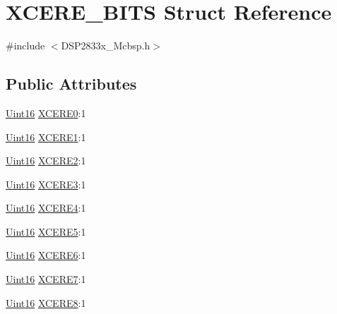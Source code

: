 \hypertarget{struct_x_c_e_r_e___b_i_t_s}{}\section{X\+C\+E\+R\+E\+\_\+\+B\+I\+T\+S Struct Reference}
\label{struct_x_c_e_r_e___b_i_t_s}


{\ttfamily \#include $<$D\+S\+P2833x\+\_\+\+Mcbsp.\+h$>$}

\subsection*{Public Attributes}
\begin{DoxyCompactItemize}
\item 
\hyperlink{_d_s_p2833x___device_8h_a59a9f6be4562c327cbfb4f7e8e18f08b}{Uint16} \hyperlink{struct_x_c_e_r_e___b_i_t_s_a74cb9805107351ca5c203ac9a94c2c35}{X\+C\+E\+R\+E0}\+:1
\item 
\hyperlink{_d_s_p2833x___device_8h_a59a9f6be4562c327cbfb4f7e8e18f08b}{Uint16} \hyperlink{struct_x_c_e_r_e___b_i_t_s_a1dd27273efef14e741394601d63bb3fe}{X\+C\+E\+R\+E1}\+:1
\item 
\hyperlink{_d_s_p2833x___device_8h_a59a9f6be4562c327cbfb4f7e8e18f08b}{Uint16} \hyperlink{struct_x_c_e_r_e___b_i_t_s_ac2d2ce4f6b28a6a240e7f7fb95eeb559}{X\+C\+E\+R\+E2}\+:1
\item 
\hyperlink{_d_s_p2833x___device_8h_a59a9f6be4562c327cbfb4f7e8e18f08b}{Uint16} \hyperlink{struct_x_c_e_r_e___b_i_t_s_a3923c3a2a0629b65ebda9eed740eddfd}{X\+C\+E\+R\+E3}\+:1
\item 
\hyperlink{_d_s_p2833x___device_8h_a59a9f6be4562c327cbfb4f7e8e18f08b}{Uint16} \hyperlink{struct_x_c_e_r_e___b_i_t_s_a2ffcf5e8b4983a119e9b90f507fd1bcb}{X\+C\+E\+R\+E4}\+:1
\item 
\hyperlink{_d_s_p2833x___device_8h_a59a9f6be4562c327cbfb4f7e8e18f08b}{Uint16} \hyperlink{struct_x_c_e_r_e___b_i_t_s_ab59c92b26ef54bb7cbae61ba59e2c8cd}{X\+C\+E\+R\+E5}\+:1
\item 
\hyperlink{_d_s_p2833x___device_8h_a59a9f6be4562c327cbfb4f7e8e18f08b}{Uint16} \hyperlink{struct_x_c_e_r_e___b_i_t_s_acc0e92f59ad3824dce0aa64afd437332}{X\+C\+E\+R\+E6}\+:1
\item 
\hyperlink{_d_s_p2833x___device_8h_a59a9f6be4562c327cbfb4f7e8e18f08b}{Uint16} \hyperlink{struct_x_c_e_r_e___b_i_t_s_ab8b8ab12dc15f37e4404149ca3b9e4da}{X\+C\+E\+R\+E7}\+:1
\item 
\hyperlink{_d_s_p2833x___device_8h_a59a9f6be4562c327cbfb4f7e8e18f08b}{Uint16} \hyperlink{struct_x_c_e_r_e___b_i_t_s_a3cbb5e42759c4c55277fa6895df4cc59}{X\+C\+E\+R\+E8}\+:1

\end{DoxyCompactItemize}
